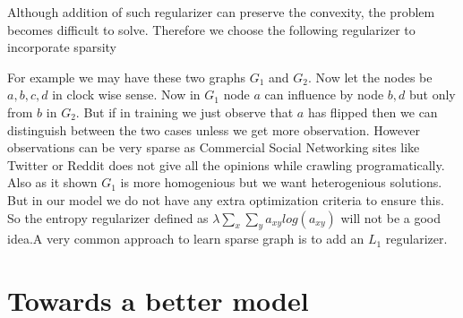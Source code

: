Although addition of such regularizer can preserve the convexity, the problem becomes difficult to solve. Therefore we choose the following regularizer to incorporate sparsity

For example we may have these two graphs $G_1$ and $G_2$. Now let the nodes be $a,b,c,d$ in clock wise sense. Now in $G_1$ node $a$ can influence by node $b,d$ but only from $b$ in $G_2$. But if in training we just observe that $a$ has flipped then we can distinguish between the two cases unless we get more observation. However observations can be very sparse as Commercial Social Networking sites like Twitter or Reddit does not give all the opinions while crawling programatically. Also as it shown $G_1$ is more homogenious but we want heterogenious solutions. But in our model we do not have any extra optimization criteria to ensure this. So the entropy regularizer defined as $\lambda \displaystyle\sum_x \displaystyle\sum_y a_{xy}log(a_{xy})$ will not be a good idea.A very common approach to learn sparse graph is to add an $L_1$ regularizer.



\section*{Towards a better model}